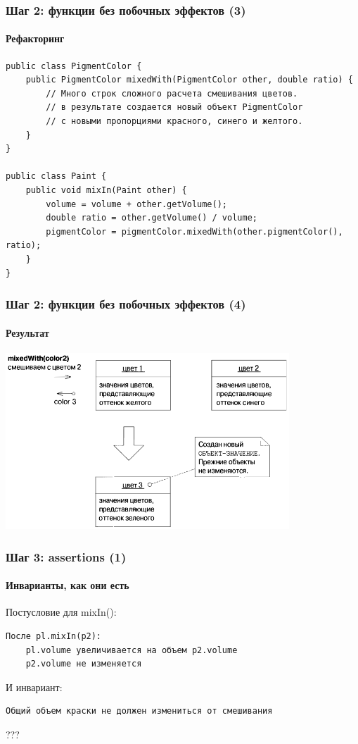 \documentclass{../../slides-style}
\begin{document}
	\begin{frame}[fragile]
		\frametitle{Шаг 2: функции без побочных эффектов (3)}
		\framesubtitle{Рефакторинг}
		\begin{footnotesize}
			\begin{verbatim}
public class PigmentColor {
    public PigmentColor mixedWith(PigmentColor other, double ratio) {
        // Много строк сложного расчета смешивания цветов.
        // в результате создается новый объект PigmentColor
        // с новыми пропорциями красного, синего и желтого.
    }
}

public class Paint {
    public void mixIn(Paint other) {
        volume = volume + other.getVolume();
        double ratio = other.getVolume() / volume;
        pigmentColor = pigmentColor.mixedWith(other.pigmentColor(), ratio);
    }
}
			\end{verbatim}
		\end{footnotesize}
\end{frame}

	\begin{frame}
		\frametitle{Шаг 2: функции без побочных эффектов (4)}
		\framesubtitle{Результат}
		\begin{center}
			\includegraphics[width=0.8\textwidth]{pigmentColorValueObject.png}
		\end{center}
	\end{frame}

	\begin{frame}[fragile]
		\frametitle{Шаг 3: assertions (1)}
		\framesubtitle{Инварианты, как они есть}
		Постусловие для mixIn():
		{\color{blue}
		\begin{verbatim}
После pl.mixIn(p2):
    pl.volume увеличивается на объем p2.volume
    p2.volume не изменяется
\end{verbatim} }
		И инвариант:
		{\color{blue}
		\begin{verbatim}
Общий объем краски не должен измениться от смешивания
\end{verbatim} }
	???
\end{frame}
\end{document}
